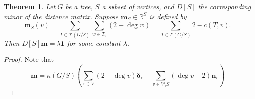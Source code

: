 \documentclass{amsart}
\newtheorem{thm}{Theorem}
\theoremstyle{definition}
\newcommand{\RR}{\mathbb{R}}
\newcommand{\trees}{\mathcal{T}}
\begin{document}
\begin{thm}
Let $G$ be a tree, $S$ a subset of vertices,
and $D[S]$ the corresponding minor of the distance matrix.
Suppose $\mathbf{m}_S \in \RR^{S}$ is defined by
\begin{equation*}
\mathbf{m}_S(v) = \sum_{T \in \mathcal T(G/S)} \sum_{w \in T_v} (2 - \deg w) 
= \sum_{T \in \trees(G/S)} 2 - c(T,v) .
\end{equation*}
Then
$D[S] \mathbf{m} = \lambda \mathbf{1}$
for some constant $\lambda$.
\end{thm}
\begin{proof}
Note that
$$
\mathbf{m}
= \kappa(G/S) \left( \sum_{v \in V}(2 - \deg v) \mathbf{\delta}_v + 
\sum_{v \in V \setminus S} ( \deg v - 2) \mathbf{n}_v 
\right)
$$
\end{proof}
\end{document}
